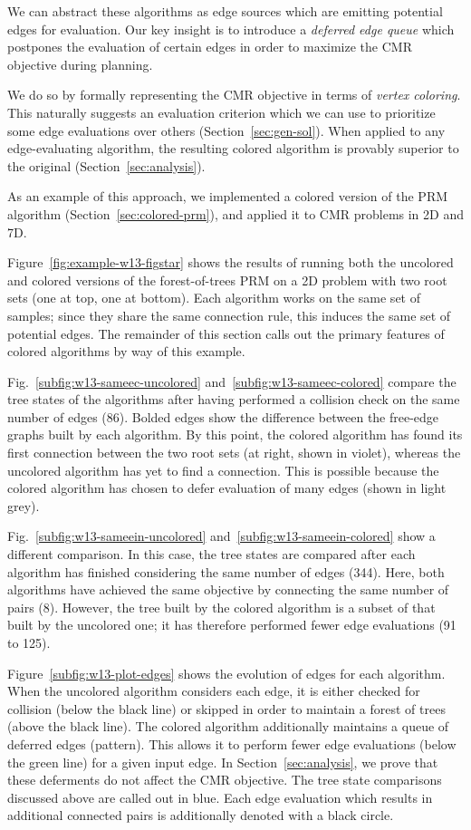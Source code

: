 We can abstract these algorithms as edge sources which are emitting
potential edges for evaluation.
Our key insight is to introduce a \emph{deferred edge queue} 
which postpones the evaluation of certain edges in order to
maximize the CMR objective during planning.

We do so by formally representing the CMR objective
in terms of \emph{vertex coloring}.
This naturally suggests an evaluation criterion which we can use to
prioritize some edge evaluations over others (Section~\ref{sec:gen-sol}).
When applied to any edge-evaluating algorithm,
the resulting colored algorithm is provably superior to the original
(Section~\ref{sec:analysis}).

As an example of this approach,
we implemented a colored version of the PRM algorithm
(Section~\ref{sec:colored-prm}),
and applied it to CMR problems in 2D and 7D.

Figure~\ref{fig:example-w13-figstar} shows the results of running
both the uncolored and colored versions of the forest-of-trees PRM
on a 2D problem with two root sets (one at top, one at bottom).
Each algorithm works on the same set of samples;
since they share the same connection rule,
this induces the same set of potential edges.
The remainder of this section calls out the primary features of colored
algorithms by way of this example.

Fig.~\ref{subfig:w13-sameec-uncolored}
and~\ref{subfig:w13-sameec-colored}
compare the tree states of the algorithms
after having performed a collision check on the same number of edges (86).
Bolded edges show the difference between the free-edge
graphs built by each algorithm.
By this point, the colored algorithm has found its first connection between
the two root sets (at right, shown in violet),
whereas the uncolored algorithm has yet to find a connection.
This is possible because the colored algorithm has chosen to defer
evaluation of many edges (shown in light grey).

Fig.~\ref{subfig:w13-sameein-uncolored}
and~\ref{subfig:w13-sameein-colored}
show a different comparison.
In this case,
the tree states are compared after each algorithm has finished considering
the same number of edges (344).
Here, both algorithms have achieved the same objective by
connecting the same number of pairs (8).
However, the tree built by the colored algorithm is a subset of that
built by the uncolored one;
it has therefore performed fewer edge evaluations (91 to 125).

Figure~\ref{subfig:w13-plot-edges} shows the evolution of edges
for each algorithm.
When the uncolored algorithm considers each edge,
it is either checked for collision (below the black line)
or skipped in order to maintain a forest of trees (above the black line).
The colored algorithm additionally maintains a queue of deferred edges
(pattern).
This allows it to perform fewer edge evaluations (below the green line)
for a given input edge.
In Section~\ref{sec:analysis}, we prove that these deferments
do not affect the CMR objective.
The tree state comparisons discussed above are called out in blue.
Each edge evaluation which results in additional connected pairs is
additionally denoted with a black circle.

